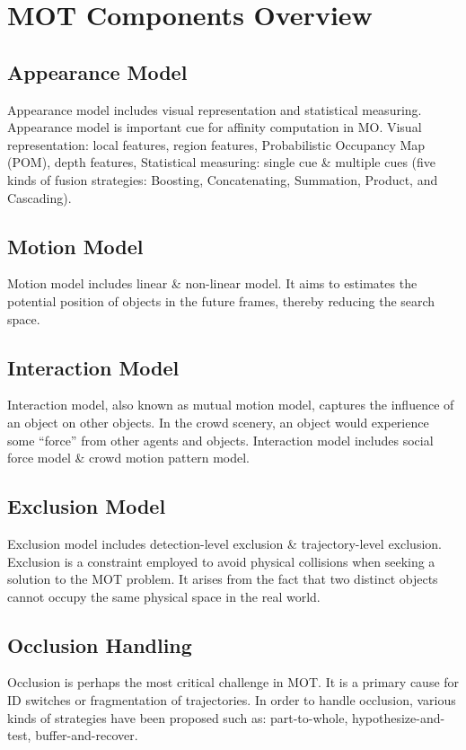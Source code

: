 \section{MOT Components Overview}
    \subsection{Appearance Model}
        Appearance model includes visual representation and statistical measuring. Appearance model is important cue for affinity computation in MO. Visual representation: local features, region features, 
        Probabilistic Occupancy Map (POM), depth features, Statistical measuring: single cue \& multiple cues (five kinds of fusion strategies: Boosting, Concatenating, Summation, Product, and Cascading).
    \subsection{Motion Model}
        Motion model includes linear \& non-linear model. It aims to estimates the potential position of objects in the future frames, thereby reducing the search space.
    \subsection{Interaction Model} 
        Interaction model, also known as mutual motion model, captures the influence of an object on other objects. In the crowd scenery, an object would experience some “force” from other agents and objects. 
        Interaction model includes social force model \& crowd motion pattern model.
    \subsection{Exclusion Model}
        Exclusion model includes detection-level exclusion \& trajectory-level exclusion. Exclusion is a constraint employed to avoid physical collisions when seeking a solution to the MOT problem. It arises from 
        the fact that two distinct objects cannot occupy the same physical space in the real world.
    \subsection{Occlusion Handling}
        Occlusion is perhaps the most critical challenge in MOT. It is a primary cause for ID switches or fragmentation of trajectories. In order to handle occlusion, various kinds of strategies have been proposed such as: 
        part-to-whole, hypothesize-and-test, buffer-and-recover.
